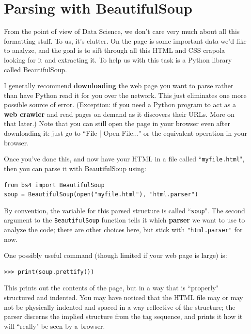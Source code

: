 \documentclass[12pt]{article}
\begin{document}
\section{Parsing with BeautifulSoup}

From the point of view of Data Science, we don't care very much about all this
formatting stuff. To us, it's clutter. On the page is some important data we'd
like to analyze, and the goal is to sift through all this HTML and CSS crapola
looking for it and extracting it. To help us with this task is a Python
library called BeautifulSoup.

I generally recommend \textbf{downloading} the web page you want to parse
rather than have Python read it for you over the network. This just eliminates
one more possible source of error. (Exception: if you need a Python program to
act as a \textbf{web crawler} and read pages on demand as it discovers their
URLs. More on that later.) Note that you can still open the page in your
browser even after downloading it: just go to ``File | Open File..." or the
equivalent operation in your browser.

Once you've done this, and now have your HTML in a file called
``\texttt{myfile.html}", then you can parse it with BeautifulSoup using:

\begin{Verbatim}[fontsize=\small,samepage=true,frame=none]
from bs4 import BeautifulSoup
soup = BeautifulSoup(open("myfile.html"), "html.parser")
\end{Verbatim}

By convention, the variable for this parsed structure is called
``\texttt{soup}". The second argument to the \texttt{BeautifulSoup} function
tells it which \textbf{parser} we want to use to analyze the code; there are
other choices here, but stick with \texttt{"html.parser"} for now.

One possibly useful command (though limited if your web page is large) is:

\begin{Verbatim}[fontsize=\small,samepage=true,frame=none]
>>> print(soup.prettify())
\end{Verbatim}

This prints out the contents of the page, but
in a way that is ``properly" structured and indented. You may have noticed
that the HTML file may or may not be physically indented and spaced in a way
reflective of the structure; the parser discerns the implied structure from
the tag sequence, and prints it how it will ``really" be seen by a browser.
\end{document}
